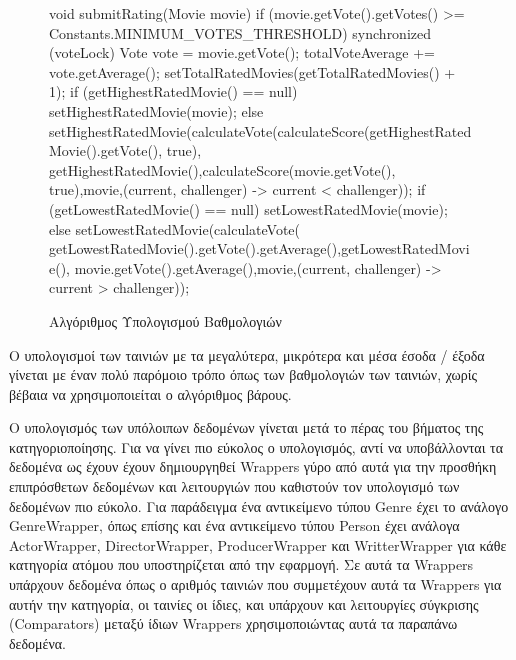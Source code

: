 \begin{figure}[h]
    \begin{javacode}
void submitRating(Movie movie) {
    if (movie.getVote().getVotes() >= Constants.MINIMUM_VOTES_THRESHOLD) {
        synchronized (voteLock) {
            Vote vote = movie.getVote();
            totalVoteAverage += vote.getAverage();
            setTotalRatedMovies(getTotalRatedMovies() + 1);
            if (getHighestRatedMovie() == null) {
                setHighestRatedMovie(movie);
            } else {
                setHighestRatedMovie(calculateVote(calculateScore(getHighestRatedMovie().getVote(), true), getHighestRatedMovie(),calculateScore(movie.getVote(), true),movie,(current, challenger) -> current < challenger));
            }
            if (getLowestRatedMovie() == null) {
                setLowestRatedMovie(movie);
            } else {
                setLowestRatedMovie(calculateVote( getLowestRatedMovie().getVote().getAverage(),getLowestRatedMovie(), movie.getVote().getAverage(),movie,(current, challenger) -> current > challenger));
            }
        }
    }
}   
    \end{javacode}
    \caption{Αλγόριθμος Υπολογισμού Βαθμολογιών}
   \label{code:ratingCalculation}
\end{figure}

Ο υπολογισμοί των ταινιών με τα μεγαλύτερα, μικρότερα και μέσα έσοδα / έξοδα γίνεται με έναν πολύ παρόμοιο τρόπο όπως των βαθμολογιών των ταινιών, χωρίς βέβαια να χρησιμοποιείται ο αλγόριθμος βάρους.

Ο υπολογισμός των υπόλοιπων δεδομένων γίνεται μετά το πέρας του βήματος της κατηγοριοποίησης. Για να γίνει πιο εύκολος ο υπολογισμός, αντί να υποβάλλονται τα δεδομένα ως έχουν έχουν δημιουργηθεί Wrappers γύρο από αυτά για την προσθήκη επιπρόσθετων δεδομένων και λειτουργιών που καθιστούν τον υπολογισμό των δεδομένων πιο εύκολο. Για παράδειγμα ένα αντικείμενο τύπου Genre έχει το ανάλογο GenreWrapper, όπως επίσης και ένα αντικείμενο τύπου Person έχει ανάλογα ActorWrapper, DirectorWrapper, ProducerWrapper και WritterWrapper για κάθε κατηγορία ατόμου που υποστηρίζεται από την εφαρμογή. Σε αυτά τα Wrappers υπάρχουν δεδομένα όπως ο αριθμός ταινιών που συμμετέχουν αυτά τα Wrappers για αυτήν την κατηγορία, οι ταινίες οι ίδιες, και υπάρχουν και λειτουργίες σύγκρισης (Comparators) μεταξύ ίδιων Wrappers χρησιμοποιώντας αυτά τα παραπάνω δεδομένα.

